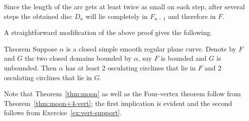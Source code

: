Since the length of the arc gets at least twice as small on each step, 
after several steps the obtained disc $D_n$ will lie completely in $F_{n-1}$ and therefore in $F$. 
\qeds

A straightforward modification of the above proof gives the following.

\begin{thm}{Theorem}\label{thm:moon+4-vert}
Suppose $\alpha$ is a closed simple smooth regular plane curve.
Denote by $F$ and $G$ the two closed domains bounded by $\alpha$, say $F$ is bounded and $G$ is unbounded.  
Then $\alpha$ has at least 2 osculating circlines that lie in $F$
and  2 osculating circlines that lie in $G$. 
\end{thm}

Note that Theorem~\ref{thm:moon} as well as the Four-vertex theorem \label{thm:4-vert} follow from Theorem~\ref{thm:moon+4-vert};
the first implication is evident and the second follows from Exercise~\ref{ex:vert-support}.



